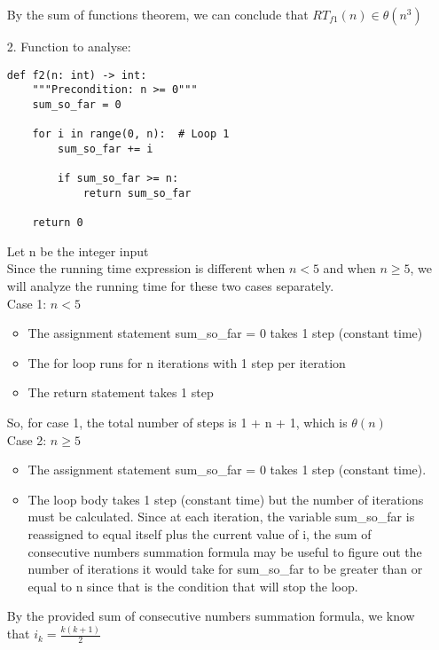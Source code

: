 \documentclass[11pt]{article}
\begin{document}
\begin{enumerate}
By the sum of functions theorem, we can conclude that $RT_{f1}(n)\in \theta (n^3)$



\newpage


\item[2.]
Function to analyse:

\begin{verbatim}
def f2(n: int) -> int:
    """Precondition: n >= 0"""
    sum_so_far = 0

    for i in range(0, n):  # Loop 1
        sum_so_far += i

        if sum_so_far >= n:
            return sum_so_far

    return 0
\end{verbatim}

Let n be the integer input \\

Since the running time expression is different when $n<5$ and when $n\ge5$, we will analyze the running time for these two cases separately. \\

Case 1: $n<5$
\begin{itemize}
  \item The assignment statement sum\_so\_far = 0 takes 1 step (constant time)
  \item The for loop runs for n iterations with 1 step per iteration 
  \item The return statement takes 1 step 
\end{itemize}

So, for case 1, the total number of steps is 1 + n + 1, which is $\theta (n)$ \\

Case 2: $n\ge5$
\begin{itemize}
  \item The assignment statement sum\_so\_far = 0 takes 1 step (constant time).
  \item The loop body takes 1 step (constant time) but the number of iterations must be calculated. Since at each iteration, the variable sum\_so\_far is reassigned to equal itself plus the current value of i, the sum of consecutive numbers summation formula may be useful to figure out the number of iterations it would take for sum\_so\_far to be greater than or equal to n since that is the condition that will stop the loop.  
\end{itemize}

By the provided sum of consecutive numbers summation formula, we know that $i_k = \frac{k(k+1)}{2}$ 


\end{enumerate}
\end{document}
